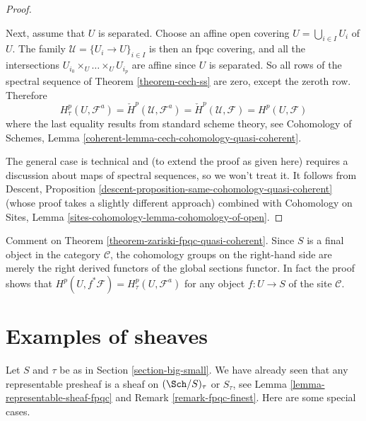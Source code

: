 \begin{proof}
\begin{enumerate}
\end{enumerate}
Next, assume that $U$ is separated. Choose an affine open covering
$U = \bigcup_{i \in I} U_i$ of $U$. The family
$\mathcal{U} = \{U_i \to U\}_{i \in I}$ is then an fpqc covering,
and all the intersections
$U_{i_0} \times_U \ldots \times_U U_{i_p}$ are affine
since $U$ is separated. So all rows of the spectral sequence of
Theorem \ref{theorem-cech-ss}
are zero, except the zeroth row. Therefore
$$
H^p_\tau(U, \mathcal{F}^a) =
\check H^p(\mathcal{U}, \mathcal{F}^a) =
\check H^p(\mathcal{U}, \mathcal{F}) = H^p(U, \mathcal{F})
$$
where the last equality results from standard scheme theory, see
Cohomology of Schemes, Lemma
\ref{coherent-lemma-cech-cohomology-quasi-coherent}.

\medskip\noindent
The general case is technical and (to extend the proof as given here)
requires a discussion about maps of spectral sequences, so we won't treat it.
It follows from
Descent, Proposition \ref{descent-proposition-same-cohomology-quasi-coherent}
(whose proof takes a slightly different approach) combined with
Cohomology on Sites, Lemma \ref{sites-cohomology-lemma-cohomology-of-open}.
\end{proof}

\begin{remark}
\label{remark-right-derived-global-sections}
Comment on Theorem \ref{theorem-zariski-fpqc-quasi-coherent}.
Since $S$ is a final object in the category $\mathcal{C}$, the cohomology
groups on the right-hand side are merely the right derived functors of the
global sections functor. In fact the proof shows that
$H^p(U, f^*\mathcal{F}) = H^p_\tau(U, \mathcal{F}^a)$
for any object $f : U \to S$ of the site $\mathcal{C}$.
\end{remark}





\section{Examples of sheaves}
\label{section-examples-sheaves}

\noindent
Let $S$ and $\tau$ be as in Section \ref{section-big-small}.
We have already seen that any representable presheaf is a sheaf on
$(\Sch/S)_\tau$ or $S_\tau$, see
Lemma \ref{lemma-representable-sheaf-fpqc}
and
Remark \ref{remark-fpqc-finest}.
Here are some special cases.

